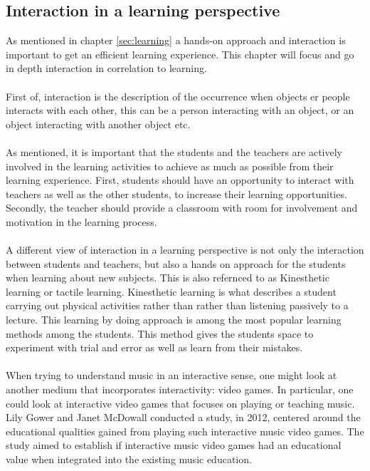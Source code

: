 \subsection{Interaction in a learning perspective}
As mentioned in chapter \ref{sec:learning} a hands-on approach and interaction is important to get an efficient learning experience. This chapter will focus and go in depth interaction in correlation to learning.\\
\\
First of, interaction is the description of the occurrence when objects er people interacts with each other, this can be a person interacting with an object, or an object interacting with another object etc.\\
\\
As mentioned, it is important that the students and the teachers are actively involved in the learning activities to achieve as much as possible from their learning experience. First, students should have an opportunity to interact with teachers as well as the other students, to increase their learning opportunities. Secondly, the teacher should provide a classroom with room for involvement and motivation in the learning process\cite{interactionlearning}.\\
\\
A different view of interaction in a learning perspective is not only the interaction between students and teachers, but also a hands on approach for the students when learning about new subjects. This is also refernced to as Kinesthetic learning or tactile learning. Kinesthetic learning is what describes a student carrying out physical activities rather than rather than listening passively to a lecture. This learning by doing approach is among the most popular learning methods among the students. This method gives the students space to experiment with trial and error as well as learn from their mistakes.\cite{kinest} \\
\\
When trying to understand music in an interactive sense, one might look at another medium that incorporates interactivity: video games. In particular, one could look at interactive video games that focuses on playing or teaching music. Lily Gower and Janet McDowall conducted a study, in 2012, centered around the educational qualities gained from playing such interactive music video games\cite{interactiveMusicVideoGames}. The study aimed to establish if interactive music video games had an educational value when integrated into the existing music education.\\

